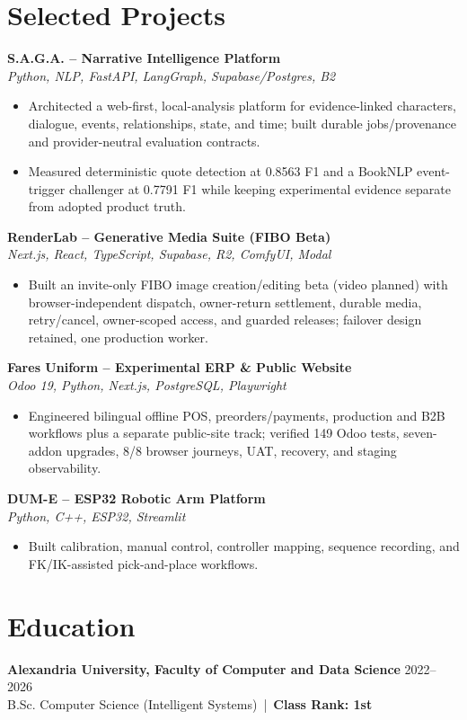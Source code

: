 \documentclass[letterpaper]{article}
\newcommand{\projectheader}[2]{\textbf{#1} \\\textit{#2} \\}
\begin{document}
\section*{Selected Projects}
\projectheader{S.A.G.A. -- Narrative Intelligence Platform}{Python, NLP, FastAPI, LangGraph, Supabase/Postgres, B2}
\begin{itemize}
\item Architected a web-first, local-analysis platform for evidence-linked characters, dialogue, events, relationships, state, and time; built durable jobs/provenance and provider-neutral evaluation contracts.
\item Measured deterministic quote detection at 0.8563 F1 and a BookNLP event-trigger challenger at 0.7791 F1 while keeping experimental evidence separate from adopted product truth.
\end{itemize}
\projectheader{RenderLab -- Generative Media Suite (FIBO Beta)}{Next.js, React, TypeScript, Supabase, R2, ComfyUI, Modal}
\begin{itemize}
\item Built an invite-only FIBO image creation/editing beta (video planned) with browser-independent dispatch, owner-return settlement, durable media, retry/cancel, owner-scoped access, and guarded releases; failover design retained, one production worker.
\end{itemize}
\projectheader{Fares Uniform -- Experimental ERP \& Public Website}{Odoo 19, Python, Next.js, PostgreSQL, Playwright}
\begin{itemize}
\item Engineered bilingual offline POS, preorders/payments, production and B2B workflows plus a separate public-site track; verified 149 Odoo tests, seven-addon upgrades, 8/8 browser journeys, UAT, recovery, and staging observability.
\end{itemize}
\projectheader{DUM-E -- ESP32 Robotic Arm Platform}{Python, C++, ESP32, Streamlit}
\begin{itemize}
\item Built calibration, manual control, controller mapping, sequence recording, and FK/IK-assisted pick-and-place workflows.
\end{itemize}

\section*{Education}
\textbf{Alexandria University, Faculty of Computer and Data Science} \hfill 2022--2026\\
B.Sc. Computer Science (Intelligent Systems) \,|\, \textbf{Class Rank: 1st}
\end{document}
